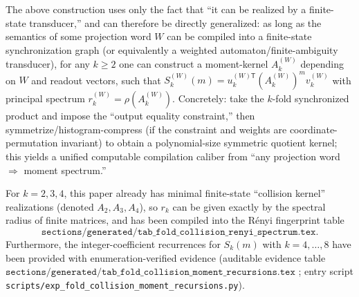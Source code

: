 \begin{remark}\label{rem:pom-moment-compiler-general-word}
The above construction uses only the fact that ``it can be realized by a finite-state transducer,'' and can therefore be directly generalized: as long as the semantics of some projection word \(W\) can be compiled into a finite-state synchronization graph (or equivalently a weighted automaton/finite-ambiguity transducer), for any \(k\ge 2\) one can construct a moment-kernel
\(
A_k^{(W)}
\)
depending on \(W\) and readout vectors, such that
\(
S_k^{(W)}(m)=u_k^{(W)\mathsf T}(A_k^{(W)})^{m}v_k^{(W)}
\)
with principal spectrum \(r_k^{(W)}=\rho(A_k^{(W)})\).
Concretely: take the \(k\)-fold synchronized product and impose the ``output equality constraint,'' then symmetrize/histogram-compress (if the constraint and weights are coordinate-permutation invariant) to obtain a polynomial-size symmetric quotient kernel; this yields a unified computable compilation caliber from ``any projection word \(\Rightarrow\) moment spectrum.''
\end{remark}

\begin{remark}[Consistency Check with $k=2,3,4$ (Already Generated Fingerprints)]\label{rem:pom-ak-consistency}
For $k=2,3,4$, this paper already has minimal finite-state ``collision kernel'' realizations (denoted $A_2,A_3,A_4$), so $r_k$ can be given exactly by the spectral radius of finite matrices, and has been compiled into the R\'enyi fingerprint table
\[
\texttt{sections/generated/tab\_fold\_collision\_renyi\_spectrum.tex}.
\]
Furthermore, the integer-coefficient recurrences for $S_k(m)$ with $k=4,\dots,8$ have been provided with enumeration-verified evidence (auditable evidence table
\(
\texttt{sections/generated/tab\_fold\_collision\_moment\_recursions.tex}
\)
; entry script \texttt{scripts/exp\_fold\_collision\_moment\_recursions.py}).
\end{remark}

